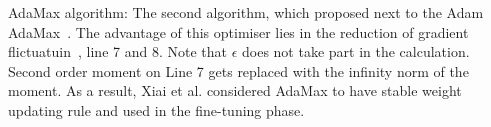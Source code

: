 AdaMax algorithm:
The second algorithm, which proposed next to the Adam AdaMax~\cite{kingma_adam_2017}.
The advantage of this optimiser lies in the reduction of gradient flictuatuin~\cite{xiao_accurate_2019}, line 7 and 8.
Note that $\epsilon$ does not take part in the calculation.
Second order moment on Line 7 gets replaced with the infinity norm of the moment.
As a result, Xiai et al. considered AdaMax to have stable weight updating rule and used in the fine-tuning phase.
\\

